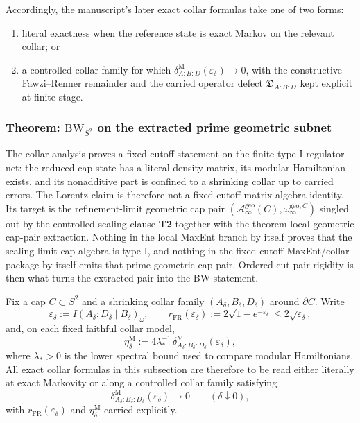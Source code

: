 Accordingly, the manuscript's later exact collar formulas take one of two forms:
\begin{enumerate}
\item literal exactness when the reference state is exact Markov on the relevant collar; or
\item a controlled collar family for which \(\delta^{\mathrm M}_{A:B:D}(\varepsilon_\delta)\to0\), with the constructive Fawzi--Renner remainder and the carried operator defect \(\mathfrak D_{A:B:D}\) kept explicit at finite stage.
\end{enumerate}
\subsubsection{\texorpdfstring{Theorem: \(\mathrm{BW}_{S^2}\) on the extracted prime geometric subnet}{4.2 Theorem: \textbackslash mathrm\{BW\}\_\{S\^{}2\} on the extracted prime geometric subnet}}\label{42-theorem-mathrmbw_s2-from-markov-locality-symmetry-regularity}

The collar analysis proves a fixed-cutoff statement on the finite type-I regulator net: the reduced cap state has a literal density matrix, its modular Hamiltonian exists, and its nonadditive part is confined to a shrinking collar up to carried errors. The Lorentz claim is therefore not a fixed-cutoff matrix-algebra identity. Its target is the refinement-limit geometric cap pair \((\mathcal A_\infty^{\mathrm{geo}}(C),\omega_\infty^{\mathrm{geo},C})\) singled out by the controlled scaling clause \textbf{T2} together with the theorem-local geometric cap-pair extraction. Nothing in the local MaxEnt branch by itself proves that the scaling-limit cap algebra is type I, and nothing in the fixed-cutoff MaxEnt/collar package by itself emits that prime geometric cap pair. Ordered cut-pair rigidity is then what turns the extracted pair into the BW statement.

Fix a cap \(C\subset S^2\) and a shrinking collar family \((A_\delta,B_\delta,D_\delta)\) around \(\partial C\). Write
\[
\varepsilon_\delta:=I(A_\delta:D_\delta\mid B_\delta)_\omega,
\qquad
r_{\mathrm{FR}}(\varepsilon_\delta):=
2\sqrt{1-e^{-\varepsilon_\delta}}
\le 2\sqrt{\varepsilon_\delta},
\]
and, on each fixed faithful collar model,
\[
\eta_\delta^{\mathrm M}
:=
4\lambda_\ast^{-1}\,
\delta^{\mathrm M}_{A_\delta:B_\delta:D_\delta}(\varepsilon_\delta),
\]
where \(\lambda_\ast>0\) is the lower spectral bound used to compare modular Hamiltonians. All exact collar formulas in this subsection are therefore to be read either literally at exact Markovity or along a controlled collar family satisfying
\[
\delta^{\mathrm M}_{A_\delta:B_\delta:D_\delta}(\varepsilon_\delta)\to 0
\qquad(\delta\downarrow 0),
\]
with \(r_{\mathrm{FR}}(\varepsilon_\delta)\) and \(\eta_\delta^{\mathrm M}\) carried explicitly.

